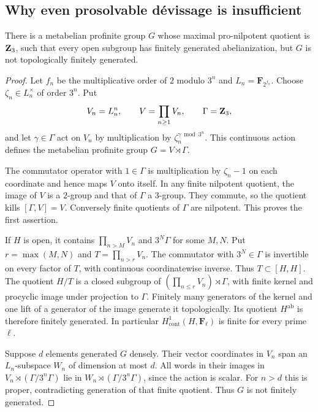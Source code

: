 \subsection{Why even prosolvable d\'evissage is insufficient}
\begin{proposition}
\label{f:metabelian}
There is a metabelian profinite group $G$ whose maximal pro-nilpotent
quotient is $\mathbf Z_3$, such that every open subgroup has finitely generated
abelianization, but $G$ is not topologically finitely generated.
\end{proposition}
\begin{proof}
Let $f_n$ be the multiplicative order of $2$ modulo $3^n$ and
$L_n=\mathbf F_{2^{f_n}}$. Choose $\zeta_n\in L_n^\times$ of order
$3^n$. Put
\[
 V_n=L_n^n,\qquad V=\prod_{n\geq1}V_n,\qquad
 \Gamma=\mathbf Z_3,
\]
and let $\gamma\in\Gamma$ act on $V_n$ by multiplication by
$\zeta_n^{\gamma\bmod 3^n}$. This continuous action defines the
metabelian profinite group $G=V\rtimes\Gamma$.

The commutator operator with $1\in\Gamma$ is multiplication by
$\zeta_n-1$ on each coordinate and hence maps $V$ onto itself.
In any finite nilpotent quotient, the image of $V$ is a $2$-group
and that of $\Gamma$ a $3$-group. They commute, so the quotient kills
$[\Gamma,V]=V$. Conversely finite quotients of $\Gamma$ are
nilpotent. This proves the first assertion.

If $H$ is open, it contains $\prod_{n>M}V_n$ and $3^N\Gamma$ for
some $M,N$. Put $r=\max(M,N)$ and $T=\prod_{n>r}V_n$.
The commutator with $3^N\in\Gamma$ is invertible on every factor
of $T$, with continuous coordinatewise inverse. Thus
$T\subset[H,H]$. The quotient $H/T$ is a closed subgroup of
$(\prod_{n\leq r}V_n)\rtimes\Gamma$, with finite kernel and
procyclic image under projection to $\Gamma$. Finitely many
generators of the kernel and one lift of a generator of the image
generate it topologically. Its quotient $H^{\mathrm{ab}}$ is
therefore finitely generated. In particular
$H^1_{\mathrm{cont}}(H,\mathbf F_\ell)$ is finite for every prime
$\ell$.

Suppose $d$ elements generated $G$ densely. Their vector coordinates
in $V_n$ span an $L_n$-subspace $W_n$ of dimension at most $d$.
All words in their images in $V_n\rtimes(\Gamma/3^n\Gamma)$ lie
in $W_n\rtimes(\Gamma/3^n\Gamma)$, since the action is scalar.
For $n>d$ this is proper, contradicting generation of that finite
quotient. Thus $G$ is not finitely generated.
\end{proof}

